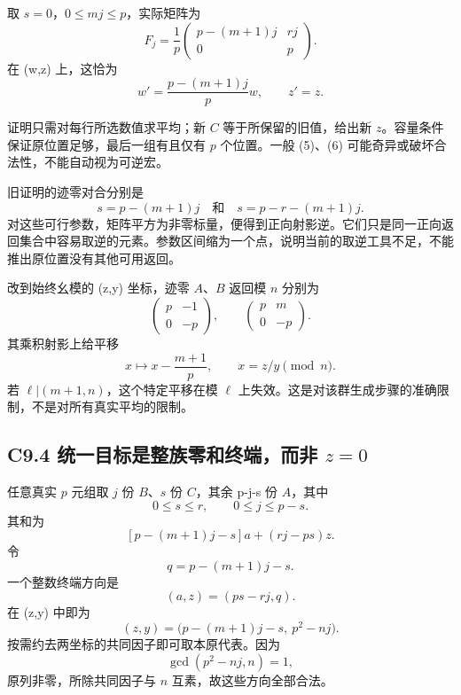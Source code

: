 \documentclass[11pt,a4paper]{article}
\theoremstyle{definition}
\numberwithin{equation}{section}
\begin{document}
{取} {\ensuremath{s=0}，\ensuremath{0\le mj\le p}，实际矩阵为} \[
F_j=\frac1p
\begin{pmatrix}
p-(m+1)j&rj\\
0&p
\end{pmatrix}.
\tag{C9.7}
\] {在} {(w,z)} {上，这恰为} \[
w'=\frac{p-(m+1)j}{p}w,\qquad z'=z.
\]

{证明只需对每行所选数值求平均；新} {\ensuremath{C}} {等于所保留的旧值，给出新} {\ensuremath{z}。容量条件保证原位置足够，最后一组有且仅有} {\ensuremath{p}} {个位置。一般} {(5)、(6)} {可能奇异或破坏合法性，不能自动视为可逆宏。}

{旧证明的迹零对合分别是} \[
s=p-(m+1)j\quad\text{和}\quad
s=p-r-(m+1)j.
\tag{C9.8}
\] {对这些可行参数，矩阵平方为非零标量，便得到正向射影逆。它们只是同一正向返回集合中容易取逆的元素。参数区间缩为一个点，说明当前的取逆工具不足，不能推出原位置没有其他可用返回。}

{改到始终幺模的} {(z,y)} {坐标，迹零} {\ensuremath{A}、\ensuremath{B}} {返回模} {\ensuremath{n}} {分别为} \[
\begin{pmatrix}p&-1\\0&-p\end{pmatrix},
\qquad
\begin{pmatrix}p&m\\0&-p\end{pmatrix}.
\] {其乘积射影上给平移} \[
\boxed{x\longmapsto x-\frac{m+1}{p},\qquad x=z/y\pmod n.}
\tag{C9.9}
\] {若} {\ensuremath{\ell |(m+1,n)}，这个特定平移在模} {\ensuremath{\ell }} {上失效。这是对该群生成步骤的准确限制，不是对所有真实平均的限制。}

\subsection*{\texorpdfstring{{C9.4} {统一目标是整族零和终端，而非} {\ensuremath{z=0}}}{C9.4 统一目标是整族零和终端，而非 }}\label{C9-h64}

{任意真实} {\ensuremath{p}} {元组取} {\ensuremath{j}} {份} {\ensuremath{B}、\ensuremath{s}} {份} {\ensuremath{C}，其余} {p-j-s} {份} {\ensuremath{A}，其中} \[
0\le s\le r,\qquad0\le j\le p-s.
\] {其和为} \[
[p-(m+1)j-s]a+(rj-ps)z.
\] {令} \[
q=p-(m+1)j-s.
\] {一个整数终端方向是} \[
(a,z)=(ps-rj,q).
\] {在} {(z,y)} {中即为} \[
\boxed{(z,y)=
\bigl(p-(m+1)j-s,\ p^2-nj\bigr).}
\tag{C9.10}
\] {按需约去两坐标的共同因子即可取本原代表。因为} \[
\gcd(p^2-nj,n)=1,
\] {原列非零，所除共同因子与} {\ensuremath{n}} {互素，故这些方向全部合法。}
\end{document}
